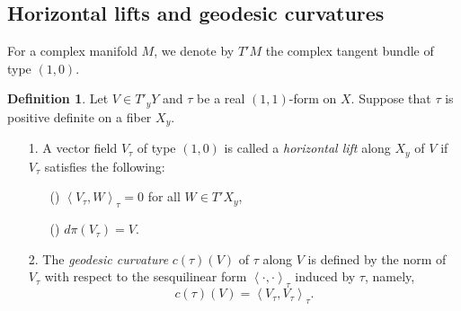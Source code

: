 \documentclass{amsart}
\theoremstyle{definition}
\newtheorem{definition}{Definition}
\numberwithin{equation}{section}
\begin{document}
\subsection{Horizontal lifts and geodesic curvatures}\label{SS:horizontal_lift}

For a complex manifold $M$, we denote by $T'M$ the complex tangent bundle of type $(1,0)$.
\begin{definition}
Let $V\in T'_yY$ and $\tau$ be a real $(1,1)$-form on $X$. Suppose that $\tau$ is positive definite on a fiber $X_y$.
\begin{itemize}
\item[1.] A vector field $V_\tau$ of type $(1,0)$ is  called a \emph{horizontal lift} along $X_y$ of $V$ if $V_\tau$ satisfies the following:
\begin{itemize}
\item [(\romannumeral1)]${\left\langle{{V_\tau,W}}\right\rangle}_\tau=0$ for all $W\in{T'X_y}$,
\item [(\romannumeral2)]$d\pi(V_\tau)=V$.
\end{itemize}
\item[2.] The \emph{geodesic curvature} $c(\tau)(V)$ of $\tau$ along $V$ is defined by the norm of $V_\tau$ with respect to the sesquilinear form ${\left\langle{{\cdot,\cdot}}\right\rangle}_\tau$ induced by $\tau$, namely,
\begin{equation*}
c(\tau)(V)={\left\langle{{V_\tau,V_\tau}}\right\rangle}_\tau.
\end{equation*}
\end{itemize}
\end{definition}
\end{document}
